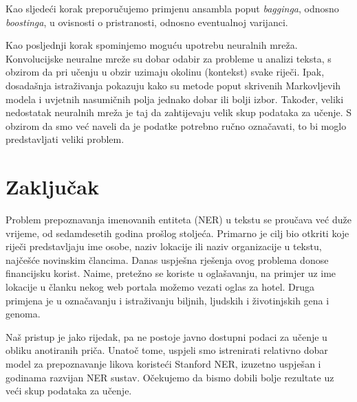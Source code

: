 \documentclass[conference]{IEEEtran}
\begin{document}
	Kao sljedeći korak preporučujemo primjenu ansambla poput \textit{bagginga}, odnosno \textit{boostinga}, u ovisnosti o pristranosti, odnosno eventualnoj varijanci.
	
	Kao posljednji korak spominjemo moguću upotrebu neuralnih mreža. Konvolucijske neuralne mreže su dobar odabir za probleme u analizi teksta, s obzirom da pri učenju u obzir uzimaju okolinu (kontekst) svake riječi. Ipak, dosadašnja istraživanja pokazuju kako su metode poput skrivenih Markovljevih modela i uvjetnih nasumičnih polja jednako dobar ili bolji izbor. Također, veliki nedostatak neuralnih mreža je taj da zahtijevaju velik skup podataka za učenje. S obzirom da smo već naveli da je podatke potrebno ručno označavati, to bi moglo predstavljati veliki problem.

\section{Zaključak}
		
	Problem prepoznavanja imenovanih entiteta (NER) u tekstu se proučava već duže vrijeme, od sedamdesetih godina prošlog stoljeća. Primarno je cilj bio otkriti koje riječi predstavljaju ime osobe, naziv lokacije ili naziv organizacije u tekstu, najčešće novinskim člancima. Danas uspješna rješenja ovog problema donose financijsku korist. Naime, pretežno se koriste u oglašavanju, na primjer uz ime lokacije u članku nekog web portala možemo vezati oglas za hotel. Druga primjena je u označavanju i istraživanju biljnih, ljudskih i životinjskih gena i genoma.
	
	Naš pristup je jako rijedak, pa ne postoje javno dostupni podaci za učenje u obliku anotiranih priča. Unatoč tome, uspjeli smo istrenirati relativno dobar model za prepoznavanje likova koristeći Stanford NER, izuzetno uspješan i godinama razvijan NER sustav. Očekujemo da bismo dobili bolje rezultate uz veći skup podataka za učenje.


\end{document}
